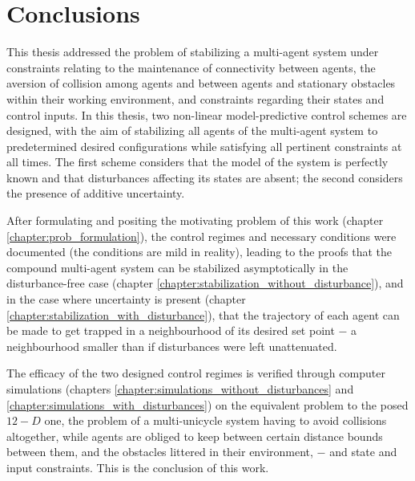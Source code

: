 \chapter{Conclusions}

This thesis addressed the problem of stabilizing a multi-agent system
under constraints relating to the maintenance of connectivity between
agents, the aversion of collision among agents and between agents and
stationary obstacles within their working environment, and constraints
regarding their states and control inputs. In this thesis, two non-linear
model-predictive control schemes are designed, with the aim of stabilizing
all agents of the multi-agent system to predetermined desired configurations
while satisfying all pertinent constraints at all times. The first scheme
considers that the model of the system is perfectly known and that disturbances
affecting its states are absent; the second considers the presence of
additive uncertainty.

After formulating and positing the motivating problem of this work
(chapter \ref{chapter:prob_formulation}), the control regimes and necessary
conditions were documented (the conditions are mild in reality), leading to
the proofs that the compound multi-agent system can be stabilized asymptotically
in the disturbance-free case
(chapter \ref{chapter:stabilization_without_disturbance}), and in the case where
uncertainty is present (chapter \ref{chapter:stabilization_with_disturbance}),
that the trajectory of each agent can be made to get trapped in a neighbourhood
of its desired set point $-$ a neighbourhood smaller than if disturbances
were left unattenuated.

The efficacy of the two designed control regimes is verified through computer
simulations (chapters \ref{chapter:simulations_without_disturbances} and
\ref{chapter:simulations_with_disturbances}) on the equivalent problem to the
posed $12-D$ one, the problem of a multi-unicycle system having to avoid
collisions altogether, while agents are obliged to keep between certain distance
bounds between them, and the obstacles littered in their environment, $-$ and
state and input constraints. This is the conclusion of this work.
